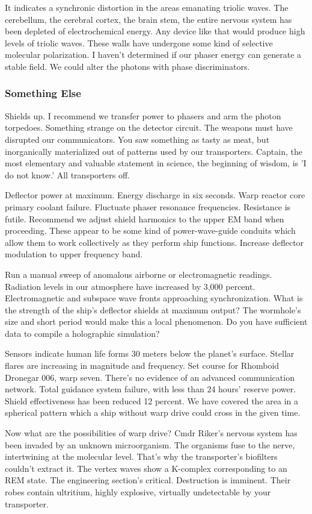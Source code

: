It indicates a synchronic distortion in the areas emanating triolic waves. The cerebellum, the cerebral cortex, the brain stem,  the entire nervous system has been depleted of electrochemical energy. Any device like that would produce high levels of triolic waves. These walls have undergone some kind of selective molecular polarization. I haven't determined if our phaser energy can generate a stable field. We could alter the photons with phase discriminators.

\subsubsection{Something Else}
Shields up. I recommend we transfer power to phasers and arm the photon torpedoes. Something strange on the detector circuit. The weapons must have disrupted our communicators. You saw something as tasty as meat, but inorganically materialized out of patterns used by our transporters. Captain, the most elementary and valuable statement in science, the beginning of wisdom, is 'I do not know.' All transporters off.

Deflector power at maximum. Energy discharge in six seconds. Warp reactor core primary coolant failure. Fluctuate phaser resonance frequencies. Resistance is futile. Recommend we adjust shield harmonics to the upper EM band when proceeding. These appear to be some kind of power-wave-guide conduits which allow them to work collectively as they perform ship functions. Increase deflector modulation to upper frequency band.

Run a manual sweep of anomalous airborne or electromagnetic readings. Radiation levels in our atmosphere have increased by 3,000 percent. Electromagnetic and subspace wave fronts approaching synchronization. What is the strength of the ship's deflector shields at maximum output? The wormhole's size and short period would make this a local phenomenon. Do you have sufficient data to compile a holographic simulation?

Sensors indicate human life forms 30 meters below the planet's surface. Stellar flares are increasing in magnitude and frequency. Set course for Rhomboid Dronegar 006, warp seven. There's no evidence of an advanced communication network. Total guidance system failure, with less than 24 hours' reserve power. Shield effectiveness has been reduced 12 percent. We have covered the area in a spherical pattern which a ship without warp drive could cross in the given time.

Now what are the possibilities of warp drive? Cmdr Riker's nervous system has been invaded by an unknown microorganism. The organisms fuse to the nerve, intertwining at the molecular level. That's why the transporter's biofilters couldn't extract it. The vertex waves show a K-complex corresponding to an REM state. The engineering section's critical. Destruction is imminent. Their robes contain ultritium, highly explosive, virtually undetectable by your transporter.